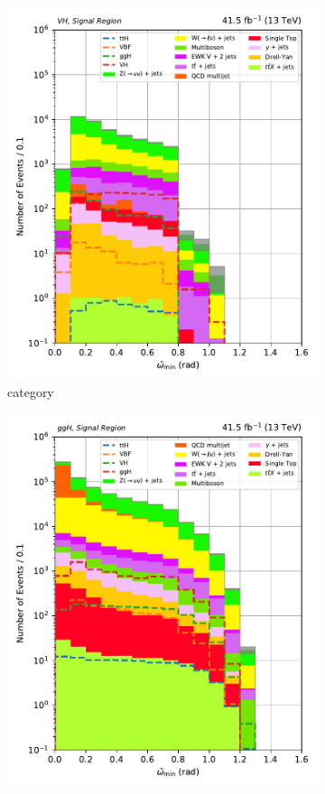 \begin{figure}[htbp]
\begin{subfigure}[b]{0.27\textwidth}
        \includegraphics[width=\textwidth]{figures/category_optimisations/with_mindphi_cut/min_omega_tilde_VH.pdf}
        \caption{\VH category}
    \end{subfigure}
    \hfill
    \begin{subfigure}[b]{0.27\textwidth}
        \includegraphics[width=\textwidth]{figures/category_optimisations/with_mindphi_cut/min_omega_tilde_ggH.pdf}

\end{subfigure}
\end{figure}
